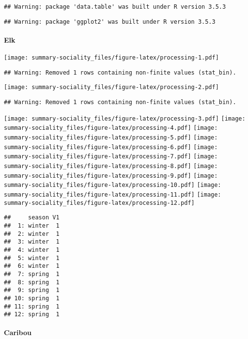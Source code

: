 \documentclass[]{article}
\title{}
\author{}
\date{}
\let\oldparagraph\paragraph
\renewcommand{\paragraph}[1]{\oldparagraph{#1}\mbox{}}
\begin{document}
\begin{verbatim}
## Warning: package 'data.table' was built under R version 3.5.3
\end{verbatim}

\begin{verbatim}
## Warning: package 'ggplot2' was built under R version 3.5.3
\end{verbatim}

\paragraph{Elk}\label{elk}

\texttt{[image: summary-sociality\_files/figure-latex/processing-1.pdf]}

\begin{verbatim}
## Warning: Removed 1 rows containing non-finite values (stat_bin).
\end{verbatim}

\texttt{[image: summary-sociality\_files/figure-latex/processing-2.pdf]}

\begin{verbatim}
## Warning: Removed 1 rows containing non-finite values (stat_bin).
\end{verbatim}

\texttt{[image: summary-sociality\_files/figure-latex/processing-3.pdf]}
\texttt{[image: summary-sociality\_files/figure-latex/processing-4.pdf]}
\texttt{[image: summary-sociality\_files/figure-latex/processing-5.pdf]}
\texttt{[image: summary-sociality\_files/figure-latex/processing-6.pdf]}
\texttt{[image: summary-sociality\_files/figure-latex/processing-7.pdf]}
\texttt{[image: summary-sociality\_files/figure-latex/processing-8.pdf]}
\texttt{[image: summary-sociality\_files/figure-latex/processing-9.pdf]}
\texttt{[image: summary-sociality\_files/figure-latex/processing-10.pdf]}
\texttt{[image: summary-sociality\_files/figure-latex/processing-11.pdf]}
\texttt{[image: summary-sociality\_files/figure-latex/processing-12.pdf]}

\begin{verbatim}
##     season V1
##  1: winter  1
##  2: winter  1
##  3: winter  1
##  4: winter  1
##  5: winter  1
##  6: winter  1
##  7: spring  1
##  8: spring  1
##  9: spring  1
## 10: spring  1
## 11: spring  1
## 12: spring  1
\end{verbatim}

\newpage 

\paragraph{Caribou}\label{caribou}
\end{document}
